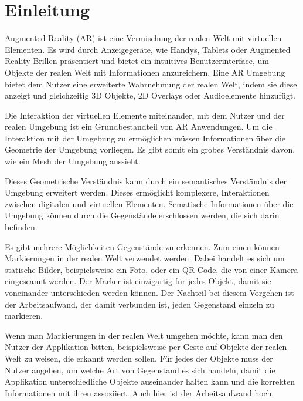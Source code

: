 \section{Einleitung}

Augmented Reality (AR) ist eine Vermischung der realen Welt mit virtuellen Elementen. Es wird durch Anzeigegeräte, wie Handys, Tablets oder Augmented Reality Brillen präsentiert und bietet ein intuitives Benutzerinterface, um Objekte der realen Welt mit Informationen anzureichern. Eine AR Umgebung bietet dem Nutzer eine erweiterte Wahrnehmung der realen Welt, indem sie diese anzeigt und gleichzeitig 3D Objekte, 2D Overlays oder Audioelemente  hinzufügt. %

Die Interaktion der virtuellen Elemente miteinander, mit dem Nutzer und der realen Umgebung ist ein Grundbestandteil von AR Anwendungen.
Um die Interaktion mit der Umgebung zu ermöglichen müssen Informationen über die Geometrie der Umgebung vorliegen. Es gibt somit ein grobes Verständnis davon, wie ein Mesh der Umgebung aussieht. 

Dieses Geometrische Verständnis kann durch ein semantisches Verständnis der Umgebung erweitert werden. Dieses ermöglicht komplexere, Interaktionen zwischen digitalen und virtuellen Elementen. Sematische Informationen über die Umgebung können durch die Gegenstände erschlossen werden, die sich darin befinden.

Es gibt mehrere Möglichkeiten Gegenstände zu erkennen. Zum einen können Markierungen in der realen Welt verwendet werden. Dabei handelt es sich um statische Bilder, beispielsweise ein Foto, oder ein QR Code, die von einer Kamera eingescannt werden. Der Marker ist einzigartig für jedes Objekt, damit sie voneinander unterschieden werden können. Der Nachteil bei diesem Vorgehen ist der Arbeitsaufwand, der damit verbunden ist, jeden Gegenstand einzeln zu markieren.%

Wenn man Markierungen in der realen Welt umgehen möchte, kann man den Nutzer der Applikation bitten, beispielsweise per Geste auf Objekte der realen Welt zu weisen, die erkannt werden sollen. Für jedes der Objekte muss der Nutzer angeben, um welche Art von Gegenstand es sich handeln, damit die Applikation unterschiedliche Objekte auseinander halten kann und die korrekten Informationen mit ihren assoziiert. Auch hier ist der Arbeitsaufwand hoch.

